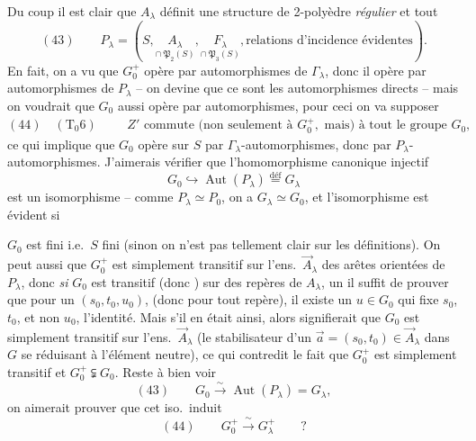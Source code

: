 \documentclass[11pt,a4paper]{article}
\begin{document}
Du coup il est clair que $A_\lambda$ définit une structure de 2-polyèdre \emph{régulier} et tout
\[
(43) \qquad P_\lambda = (S, \underset{\cap\ \mathfrak{P}_2(S)}{A_\lambda}, \underset{\cap\ \mathfrak{P}_3(S)}{F_\lambda}, \text{relations d'incidence évidentes}) .
\]
En fait, on a vu que $G_0^{+}$ opère par automorphismes de $\Gamma_\lambda$, donc il opère par automorphismes de $P_\lambda$ -- on devine que ce sont les automorphismes directs -- mais on voudrait que $G_0$ aussi opère par automorphismes, pour ceci on va supposer
\[
(44) \quad (\text{T}_0 6) \qquad
\begin{array}{l}
Z' \text{ commute (non seulement à } G_0^{+}, \text{ mais) à tout le groupe } G_0,
\end{array}
\]
ce qui implique que $G_0$ opère sur $S$ par $\Gamma_\lambda$-automorphismes, donc par $P_\lambda$-automorphismes.  J'aimerais vérifier que l'homomorphisme canonique injectif
\[
G_0 \hookrightarrow \operatorname{Aut}(P_\lambda) \overset{\text{déf}}{=} G_\lambda
\]
est un isomorphisme -- comme $P_\lambda \simeq P_0$, on a $G_\lambda \simeq G_0$, et l'isomorphisme est évident si

$G_0$ est fini i.e.\ $S$ fini (sinon on n'est pas tellement clair sur les définitions). On peut aussi  que  $G_0^{+}$ est simplement transitif sur l'ens.\ $\vec A_\lambda$ des arêtes orientées de  $P_\lambda$, donc \emph{si  }  $G_0$ est transitif (donc ) sur   des repères de $A_\lambda$,    un \struck{\ill{}} il suffit de prouver que pour un  $(s_0, t_0, u_0)$, (donc pour tout repère), il existe un $u \in G_0$ \struck{\ill{}} qui fixe $s_0$, $t_0$, et non $u_0$,    l'identité. Mais s'il en était ainsi, alors signifierait que $G_0$ est simplement transitif sur l'ens.\ $\vec A_\lambda$ (le stabilisateur d'un $\vec a = (s_0, t_0) \in \vec A_\lambda$ dans $G$ se réduisant à l'élément neutre),
ce qui contredit le fait que $G_0^{+}$ est simplement transitif et \struck{\ill{}} $G_0^{+} \subsetneqq G_0$. Reste à bien voir
\[
(43) \qquad G_0 \xrightarrow{\ \sim\ } \operatorname{Aut}(P_\lambda) = G_\lambda ,
\]
on aimerait prouver que cet iso.\ induit
\[
(44) \qquad G_0^{+} \xrightarrow{\ \sim\ } G_\lambda^{+} \qquad ?
\]
\end{document}
